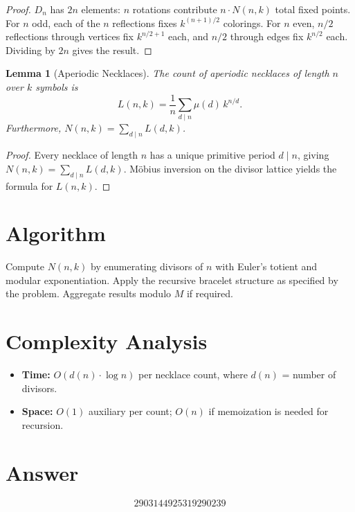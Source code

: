 \documentclass[11pt]{article}
\newtheorem{lemma}[theorem]{Lemma}
\begin{document}
\begin{proof}
$D_n$ has $2n$ elements: $n$ rotations contribute $n \cdot N(n,k)$ total fixed points. For $n$ odd, each of the $n$ reflections fixes $k^{(n+1)/2}$ colorings. For $n$ even, $n/2$ reflections through vertices fix $k^{n/2+1}$ each, and $n/2$ through edges fix $k^{n/2}$ each. Dividing by $2n$ gives the result.
\end{proof}

\begin{lemma}[Aperiodic Necklaces]
The count of aperiodic necklaces of length $n$ over $k$ symbols is
\[
L(n,k) = \frac{1}{n}\sum_{d \mid n}\mu(d)\,k^{n/d}.
\]
Furthermore, $N(n,k) = \sum_{d \mid n} L(d,k)$.
\end{lemma}

\begin{proof}
Every necklace of length $n$ has a unique primitive period $d \mid n$, giving $N(n,k) = \sum_{d \mid n} L(d,k)$. M\"obius inversion on the divisor lattice yields the formula for $L(n,k)$.
\end{proof}

\section{Algorithm}

Compute $N(n,k)$ by enumerating divisors of $n$ with Euler's totient and modular exponentiation. Apply the recursive bracelet structure as specified by the problem. Aggregate results modulo $M$ if required.

\section{Complexity Analysis}

\begin{itemize}
\item \textbf{Time:} $O(d(n) \cdot \log n)$ per necklace count, where $d(n)$ = number of divisors.
\item \textbf{Space:} $O(1)$ auxiliary per count; $O(n)$ if memoization is needed for recursion.
\end{itemize}

\section{Answer}

\[
\boxed{2903144925319290239}
\]
\end{document}
